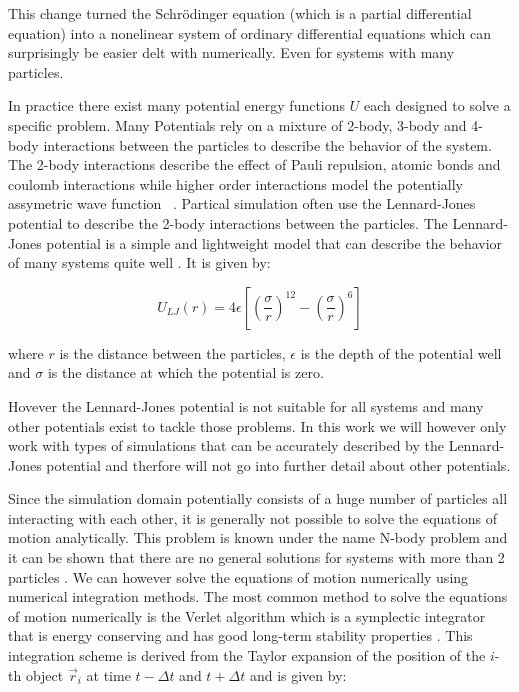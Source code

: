 This change turned the Schrödinger equation (which is a partial differential equation) into a nonelinear system of ordinary differential equations which can surprisingly be easier delt with numerically. Even for systems with many particles.

In practice there exist many potential energy functions $U$ each designed to solve a specific problem. Many Potentials rely on a mixture of 2-body, 3-body and 4-body interactions between the particles to describe the behavior of the system. The 2-body interactions describe the effect of Pauli repulsion, atomic bonds and coulomb interactions while higher order interactions model the potentially assymetric wave function ~\cite{Leimkuhler2015}. Partical simulation often use the Lennard-Jones potential to describe the 2-body interactions between the particles. The Lennard-Jones potential is a simple and lightweight model that can describe the behavior of many systems quite well . It is given by:

\begin{equation}
      U_{LJ}(r) = 4 \epsilon \left[ \left( \frac{\sigma}{r} \right)^{12} - \left( \frac{\sigma}{r} \right)^6 \right]
\end{equation}

where $r$ is the distance between the particles, $\epsilon$ is the depth of the potential well and $\sigma$ is the distance at which the potential is zero.

Hovever the Lennard-Jones potential is not suitable for all systems and many other potentials exist to tackle those problems. In this work we will however only work with types of simulations that can be accurately described by the Lennard-Jones potential and therfore will not go into further detail about other potentials.

Since the simulation domain potentially consists of a huge number of particles all interacting with each other, it is generally not possible to solve the equations of motion analytically. This problem is known under the name N-body problem and it can be shown that there are no general solutions for systems with more than 2 particles . We can however solve the equations of motion numerically using numerical integration methods. The most common method to solve the equations of motion numerically is the Verlet algorithm which is a symplectic integrator that is energy conserving and has good long-term stability properties . This integration scheme is derived from the Taylor expansion of the position of the $i$-th object $\vec{r}_i$ at time $t - \Delta t$ and $t + \Delta t$ and is given by:

